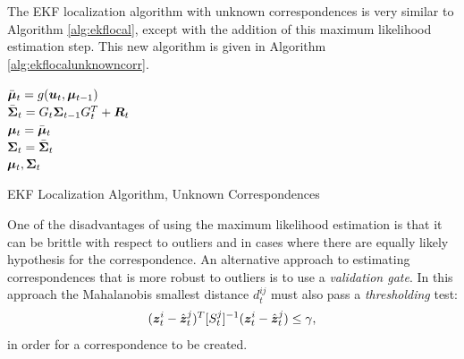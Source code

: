 The EKF localization algorithm with unknown correspondences is very similar to Algorithm \ref{alg:ekflocal}, except with the addition of this maximum likelihood estimation step. This new algorithm is given in Algorithm \ref{alg:ekflocalunknowncorr}.
\begin{algorithm}[ht]
 $\bar{\bm{\mu}}_t = g(\bm{u}_t,\bm{\mu}_{t-1})$\\
 $\bar{\bm{\Sigma}}_t = G_t\bm{\Sigma}_{t-1} G_t^{T} + \bm{R}_t$\\
 $\bm{\mu}_t = \bar{\bm{\mu}}_t$\\
 $\bm{\Sigma}_t = \bar{\bm{\Sigma}}_t$\\
 \Return $\bm{\mu}_t, \bm{\Sigma}_t$
 \caption{EKF Localization Algorithm, Unknown Correspondences}
 \label{alg:ekflocalunknowncorr}
\end{algorithm}


One of the disadvantages of using the maximum likelihood estimation is that it can be brittle with respect to outliers and in cases where there are equally likely hypothesis for the correspondence.
An alternative approach to estimating correspondences that is more robust to outliers is to use a \textit{validation gate}. In this approach the Mahalanobis smallest distance $d_t^{ij}$ must also pass a \textit{thresholding} test:
\begin{equation*}
(\bm{z}_t^i-\hat{\bm{z}}^{j}_t)^T [S_t^{j}]^{-1} (\bm{z}_t^i-\hat{\bm{z}}^{j}_t) \leq \gamma,
\end{equation*}
in order for a correspondence to be created.



